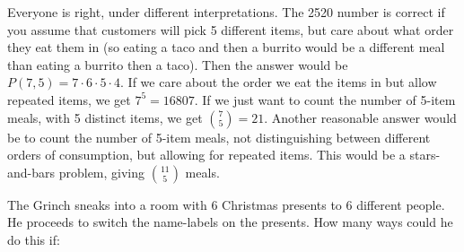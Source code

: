 \begin{questions}
\begin{answer}
  Everyone is right, under different interpretations.  The 2520 number is correct if you assume that customers will pick 5 different items, but care about what order they eat them in (so eating a taco and then a burrito would be a different meal than eating a burrito then a taco).  Then the answer would be $P(7,5) = 7\cdot 6 \cdot 5 \cdot 4$.  If we care about the order we eat the items in but allow repeated items, we get $7^5 = 16807$.  If we just want to count the number of 5-item meals, with 5 distinct items, we get ${7 \choose 5} = 21$.  Another reasonable answer would be to count the number of 5-item meals, not distinguishing between different orders of consumption, but allowing for repeated items.  This would be a stars-and-bars problem, giving ${11 \choose 5}$ meals.
\end{answer}




\question The Grinch sneaks into a room with 6 Christmas presents to 6 different people.  He proceeds to switch the name-labels on the presents.  How many ways could he do this if:

	\begin{answer}
\end{answer}
\end{questions}
